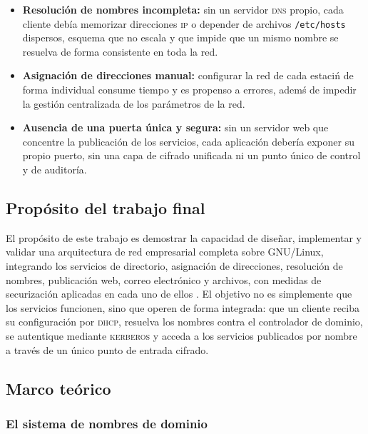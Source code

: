 \begin{itemize}
  \item \textbf{Resoluci\'on de nombres incompleta:} sin un servidor
        \textsc{dns} propio, cada cliente deb\'ia memorizar direcciones
        \textsc{ip} o depender de archivos \texttt{/etc/hosts} dispersos,
        esquema que no escala y que impide que un mismo nombre se resuelva
        de forma consistente en toda la red.
  \item \textbf{Asignaci\'on de direcciones manual:} configurar la red de
        cada estaci\'n de forma individual consume tiempo y es propenso a
        errores, adem\'s de impedir la gesti\'on centralizada de los
        par\'ametros de la red.
  \item \textbf{Ausencia de una puerta \'unica y segura:} sin un servidor web
        que concentre la publicaci\'on de los servicios, cada aplicaci\'on
        deber\'ia exponer su propio puerto, sin una capa de cifrado
        unificada ni un punto \'unico de control y de auditor\'ia.
\end{itemize}

\subsection{Prop\'osito del trabajo final}

El prop\'osito de este trabajo es demostrar la capacidad de dise\~nar,
implementar y validar una arquitectura de red empresarial completa sobre
GNU/Linux, integrando los servicios de directorio, asignaci\'on de direcciones,
resoluci\'on de nombres, publicaci\'on web, correo electr\'onico y
archivos, con medidas de securizaci\'on aplicadas en cada uno de ellos
\cite{debianReference, hertzog2020}. El objetivo no es simplemente que los
servicios funcionen, sino que operen de forma integrada: que un cliente
reciba su configuraci\'on por \textsc{dhcp}, resuelva los nombres contra el
controlador de dominio, se autentique mediante \textsc{kerberos} y
acceda a los servicios publicados por nombre a trav\'es de un \'unico
punto de entrada cifrado.

\subsection{Marco te\'orico}

\subsubsection{El sistema de nombres de dominio}

